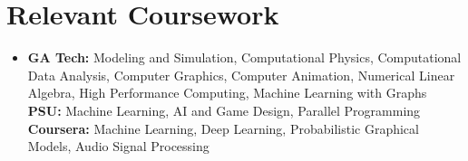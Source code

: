 \documentclass[letterpaper,11pt]{article}
\newcommand{\resumeItem}[1]{
  \item\small{
    {#1 \vspace{-2pt}}
  }
}
\newcommand{\resumeSubHeadingListStart}{\begin{itemize}[leftmargin=0.15in, label={}]}
\newcommand{\resumeSubHeadingListEnd}{\end{itemize}}
\newcommand{\resumeSectionBody}[1]{
  \vspace{0.7em}
  \small #1
  \vspace{-5pt}
}
\begin{document}
\section{Relevant Coursework}
  \resumeSubHeadingListStart
    \resumeItem{
      \textbf{GA Tech:}{ Modeling and Simulation, Computational Physics, Computational Data Analysis, Computer Graphics, Computer Animation, Numerical Linear Algebra, High Performance Computing, Machine Learning with Graphs} \\ \vspace{3pt}
      \textbf{PSU:}{ Machine Learning, AI and Game Design, Parallel Programming} \\ \vspace{3pt}
      \textbf{Coursera:}{ Machine Learning, Deep Learning, Probabilistic Graphical Models, Audio Signal Processing} \\ \vspace{3pt}
    }
    \resumeSubHeadingListEnd


\end{document}
